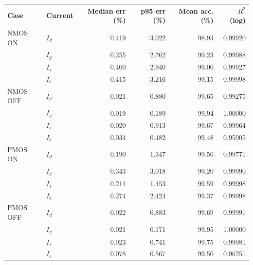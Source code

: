 \begin{tabular}{llrrrr}
\hline
Case & Current & Median err (\%) & p95 err (\%) & Mean acc. (\%) & $R^2$ (log) \\
\hline
NMOS ON & $I_{d}$ & 0.419 & 3.022 & 98.93 & 0.99920 \\
 & $I_{g}$ & 0.255 & 2.762 & 99.23 & 0.99988 \\
 & $I_{s}$ & 0.400 & 2.940 & 99.00 & 0.99927 \\
 & $I_{b}$ & 0.415 & 3.216 & 99.15 & 0.99998 \\
NMOS OFF & $I_{d}$ & 0.021 & 0.880 & 99.65 & 0.99275 \\
 & $I_{g}$ & 0.019 & 0.189 & 99.94 & 1.00000 \\
 & $I_{s}$ & 0.020 & 0.913 & 99.67 & 0.99964 \\
 & $I_{b}$ & 0.034 & 0.482 & 99.48 & 0.95905 \\
PMOS ON & $I_{d}$ & 0.190 & 1.347 & 99.56 & 0.99771 \\
 & $I_{g}$ & 0.343 & 3.018 & 99.20 & 0.99990 \\
 & $I_{s}$ & 0.211 & 1.453 & 99.59 & 0.99998 \\
 & $I_{b}$ & 0.274 & 2.424 & 99.37 & 0.99998 \\
PMOS OFF & $I_{d}$ & 0.022 & 0.883 & 99.69 & 0.99991 \\
 & $I_{g}$ & 0.021 & 0.171 & 99.95 & 1.00000 \\
 & $I_{s}$ & 0.023 & 0.741 & 99.75 & 0.99981 \\
 & $I_{b}$ & 0.078 & 0.567 & 99.50 & 0.96251 \\
\hline
\end{tabular}
